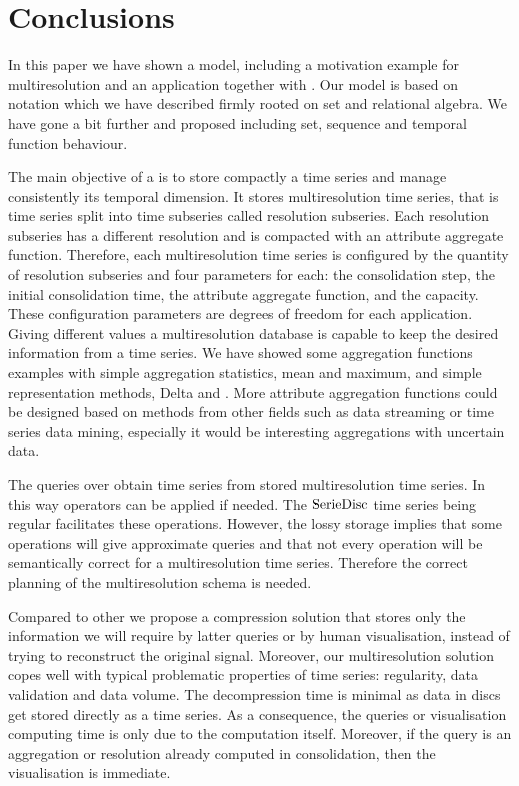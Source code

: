 





\section{Conclusions}
\label{sec:concl-future-work}


In this paper we have shown a  model, including a
motivation example for multiresolution and an application together
with . Our  model is based on 
notation which we have described firmly rooted on set and relational
algebra. We have gone a bit further and proposed  including
set, sequence and temporal function behaviour.



The main objective of a  is to store compactly a time
series and manage consistently its temporal dimension.  It stores
multiresolution time series, that is time series split into time
subseries called resolution subseries.  Each resolution subseries has
a different resolution and is compacted with an attribute aggregate
function. Therefore, each multiresolution time series is configured by
the quantity of resolution subseries and four parameters for each: the
consolidation step, the initial consolidation time, the attribute
aggregate function, and the capacity.  These configuration parameters
are degrees of freedom for each application. Giving different values a
multiresolution database is capable to keep the desired information
from a time series. %
We have showed some aggregation functions examples with simple
aggregation statistics, mean and maximum, and simple representation
methods, Delta and \zohe{}. More attribute aggregation functions could
be designed based on methods from other fields such as data streaming
or time series data mining, especially it would be interesting aggregations with uncertain data.


The queries over  obtain time series from stored
multiresolution time series. In this way  operators can be
applied if needed. The $\operatorname{SerieDisc}$ time series being regular
facilitates these operations. However, the lossy storage implies that
some operations will give approximate queries and that not every
 operation will be semantically correct for a
multiresolution time series. Therefore the correct planning of the
multiresolution schema is needed.


Compared to other  we propose a compression solution that
stores only the information we will require by latter queries or by
human visualisation, instead of trying to reconstruct the original
signal.  Moreover, our multiresolution solution copes well with
typical problematic properties of time series: regularity, data
validation and data volume.  The decompression time is minimal as data
in discs get stored directly as a time series. As a consequence, the
queries or visualisation computing time is only due to the computation
itself. Moreover, if the query is an aggregation or resolution already
computed in  consolidation, then the visualisation is
immediate.


